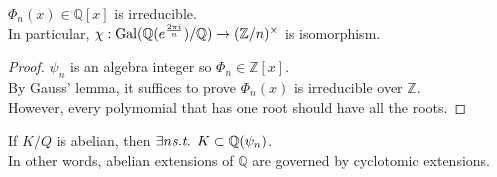  \begin{theorem}
     $ \Phi_n(x)\in \mathbb{Q}[x] $ is irreducible.\\
     In particular,  $ \chi:\operatorname{Gal}(\mathbb{Q}(e^{\frac{2\pi i}{n}})/\mathbb{Q})\rightarrow (\mathbb{Z}/n)^\times   $ is isomorphism.  
 \end{theorem}
 \begin{proof}
     $ \psi_n  $ is an algebra integer so  $ \Phi_n\in \mathbb{Z}[x] $.\\
     By Gauss' lemma, it suffices to prove  $ \Phi_n(x)  $ is irreducible over  $ \mathbb{Z} $.\\
     However, every polymomial that has one root should have all the roots.  
 \end{proof}
 \begin{theorem}
    If  $ K/Q  $ is abelian, then  $ \exists n\emph{s.t. }   K\subset\mathbb{Q}(\psi_n)   $.\\
    In other words, abelian extensions of  $ \mathbb{Q } $ are governed by cyclotomic extensions. 
 \end{theorem}